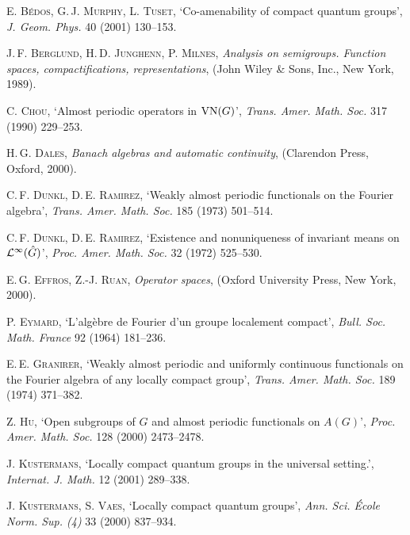 \documentclass[twoside,a4paper]{article}
\theoremstyle{definition}
\theoremstyle{remark}
\newcommand{\mc}{\mathcal}
\begin{document}
\begin{thebibliography}{99}
\normalsize
\newcommand{\bibbook}[3]{\textsc{#1}, \emph{#2}, (#3).}
\newcommand{\bibpaper}[6]{\textsc{#1}, `#2', \emph{#3} #4 (#5) #6.}
\newcommand{\bibpreprint}[2]{\textsc{#1}, `#2', preprint.}

 \bibpaper{E. B\'edos, G.\,J. Murphy, L. Tuset}
   {Co-amenability of compact quantum groups}
   {J. Geom. Phys.}{40}{2001}{130--153}

 \bibbook{J.\,F. Berglund, H.\,D. Junghenn, P. Milnes}
   {Analysis on semigroups.  Function spaces, compactifications, representations}
   {John Wiley \& Sons, Inc., New York, 1989}

 \bibpaper{C. Chou}
   {Almost periodic operators in ${\rm VN}(G)$}
   {Trans. Amer. Math. Soc.}{317}{1990}{229--253}

 \bibbook{H.\,G. Dales}
   {Banach algebras and automatic continuity}
   {Clarendon Press, Oxford, 2000}

 \bibpaper{C.\,F. Dunkl, D.\,E. Ramirez}
   {Weakly almost periodic functionals on the Fourier algebra}
   {Trans. Amer. Math. Soc.}{185}{1973}{501--514}

 \bibpaper{C.\,F. Dunkl, D.\,E. Ramirez}
   {Existence and nonuniqueness of invariant means on {${\mc L}\sp{\infty }(\hat G)$}}
   {Proc. Amer. Math. Soc.}{32}{1972}{525--530}

 \bibbook{E.\,G. Effros, Z.-J. Ruan}
   {Operator spaces}
   {Oxford University Press, New York, 2000}

 \bibpaper{P. Eymard}
   {L'alg\`ebre de Fourier d'un groupe localement compact}
   {Bull. Soc. Math. France}{92}{1964}{181--236}

 \bibpaper{E.\,E. Granirer}
   {Weakly almost periodic and uniformly continuous functionals
   on the Fourier algebra of any locally compact group}
   {Trans. Amer. Math. Soc.}{189}{1974}{371--382}

 \bibpaper{Z. Hu}
   {Open subgroups of $G$ and almost periodic functionals on $A(G)$}
   {Proc. Amer. Math. Soc.}{128}{2000}{2473--2478}

 \bibpaper{J. Kustermans}
   {Locally compact quantum groups in the universal setting.}
   {Internat. J. Math.}{12}{2001}{289--338}

 \bibpaper{J. Kustermans, S. Vaes}
   {Locally compact quantum groups}
   {Ann. Sci. \'Ecole Norm. Sup. (4)}{33}{2000}{837--934}


\end{thebibliography}
\end{document}
